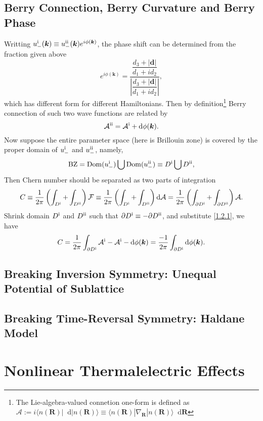 \documentclass[10pt,nofootinbib]{revtex4}
\newcommand*\dd{\mathop{}\!\mathrm{d}}
\newcommand{\RN}[1]{%
  \textup{\uppercase\expandafter{\romannumeral#1}}%
}
\begin{document}
	\subsection{Berry Connection, Berry Curvature and Berry Phase}
		Writting $u_-^{\RN{1}}(\bm{k})\equiv u_-^{\RN{2}}(\bm{k})e^{i\phi(\bm{k})}$, the phase shift can be determined from the fraction given above 
		\begin{equation}\label{1.2.1}
			e^{i\phi(\bm{k})}=\dfrac{\dfrac{d_3+|\bm{d}|}{d_1+id_2}}{\left|\dfrac{d_3+|\bm{d}|}{d_1+id_2}\right|},
		\end{equation}
		which has different form for different Hamiltonians. Then by definition\footnote{The Lie-algebra-valued connetion one-form is defined as $\mathcal{A}:=i \langle n(\bm{R})|\dd|n(\bm{R})\rangle\equiv \langle n(\bm{R})|\nabla_{\bm{R}}|n(\bm{R})\rangle\dd\bm{\bm{R}}$} Berry connection of such two wave functions are related by
		\begin{equation}\label{1.2.1}
			\mathcal{A}^{\RN{2}}=\mathcal{A}^{\RN{1}}+\dd\phi(\bm{k}).
		\end{equation}
		Now suppose the entire parameter space (here is Brillouin zone) is covered by the proper domain of $u_-^{\RN{1}}$ and $u_-^{\RN{2}}$, namely,
		\begin{equation*}
			\mathrm{BZ}=\mathop{\mathrm{Dom}}(u_-^{\RN{1}})\bigcup\mathop{\mathrm{Dom}}(u_-^{\RN{2}})\equiv D^{\RN{1}}\bigcup D^{\RN{2}},
		\end{equation*}
		Then Chern number should be separated as two parts of integration
		\begin{equation*}
			C\equiv\dfrac{1}{2\pi}\left(\int_{D^{\RN{1}}}+\int_{D^{\RN{2}}}\right)\mathcal{F}\equiv\dfrac{1}{2\pi}\left(\int_{D^{\RN{1}}}+\int_{D^{\RN{2}}}\right)\dd\mathcal{A}=\dfrac{1}{2\pi}\left(\int_{\partial D^{\RN{1}}}+\int_{\partial D^{\RN{2}}}\right)\mathcal{A}.
		\end{equation*}
		Shrink domain $D^{\RN{1}}$ and $D^{\RN{2}}$ such that $\partial D^{\RN{1}}\equiv-\partial D^{\RN{2}}$, and substitute \eqref{1.2.1}, we have
		\begin{equation}\label{1.2.2}
			C=\dfrac{1}{2\pi}\int_{\partial D^{\RN{1}}}\mathcal{A}^{\RN{1}}-\mathcal{A}^{\RN{1}}-\dd\phi(\bm{k})=\dfrac{-1}{2\pi}\int_{\partial D^{\RN{1}}}\dd\phi(\bm{k}).
		\end{equation}

	\subsection{Breaking Inversion Symmetry: Unequal Potential of Sublattice}
	\subsection{Breaking Time-Reversal Symmetry: Haldane Model}

\section{Nonlinear Thermalelectric Effects}



\end{document}
